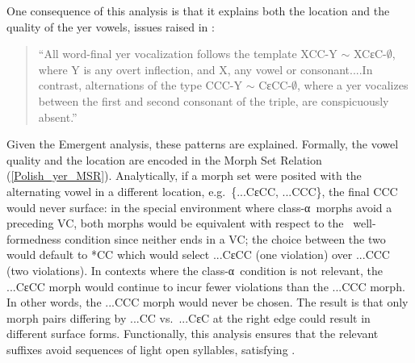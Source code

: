 One consequence of this analysis is that it explains both the location and the quality of the yer vowels, issues raised in \citet{Jarosz:2005_BLS}:

\begin{quote}``All word-final yer vocalization follows the template XCC-Y $\sim$ XCɛC-$\emptyset$, where Y is any overt inflection, and X, any vowel or consonant....In contrast, alternations of the type CCC-Y $\sim$ CɛCC-$\emptyset$, where a yer vocalizes between the first and second consonant of the triple, are conspicuously absent.'' \citet[184--5]{Jarosz:2005_BLS} \end{quote}



Given the Emergent analysis,  these patterns are explained. Formally, the vowel quality and the location are encoded in the  Morph Set Relation (\ref{Polish_yer_MSR}). Analytically, if a morph set were posited with the alternating vowel in a different location, e.g.\ \{...CɛCC, ...CCC\}, the final CCC would never surface: in the special environment where class-α\ morphs avoid a preceding VC, both morphs would be equivalent with respect to the \PolVC\ well-formedness condition since neither ends in a VC; the choice between the two would default to *CC which would select ...CɛCC (one violation) over ...CCC (two violations). {In contexts where the class-α\ condition is not relevant, the ...CɛCC morph would continue to incur fewer violations than the ...CCC morph. In other words, the ...CCC morph would never be chosen. The result is that only morph pairs differing by  ...CC  vs.\ ...CɛC  at the right edge could result in different surface forms.} Functionally, this analysis ensures that the relevant suffixes avoid sequences of light open syllables, satisfying \PolVC.

